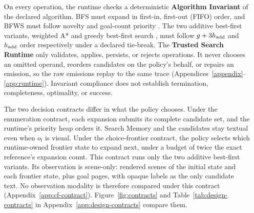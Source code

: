 On every operation, the runtime checks a deterministic \textbf{Algorithm Invariant} of the declared algorithm. BFS must expand in first-in, first-out (FIFO) order, and BFWS must follow novelty and goal-count priority \citep{lipovetzky2017bestfirst}. The two additive best-first variants, weighted A* \citep{hart1968formal,pohl1970heuristic} and greedy best-first search \citep{bonet2001planning}, must follow $g + 3h_{\rm add}$ and $h_{\rm add}$ order respectively under a declared tie-break.
The \textbf{Trusted Search Runtime} only validates, applies, persists, or rejects operations. It never chooses an omitted operand, reorders candidates on the policy's behalf, or repairs an emission, so the raw emissions replay to the same trace (Appendices~\ref{appendix}--\ref{app:runtime}). Invariant compliance does not establish termination, completeness, optimality, or success.

The two decision contracts differ in what the policy chooses. Under the enumeration contract, each expansion submits its complete candidate set, and the runtime's priority heap orders it. Search Memory and the candidates stay textual even when $o_t$ is visual. Under the choice-frontier contract, the policy selects which runtime-owned frontier state to expand next, under a budget of twice the exact reference's expansion count. This contract runs only the two additive best-first variants. Its observation is scene-only: rendered scenes of the initial state and each frontier state, plus goal pages, with opaque labels as the only candidate text. No observation modality is therefore compared under this contract (Appendix~\ref{app:cf-contract}). Figure~\ref{fig:contracts} and Table~\ref{tab:design-contracts} in Appendix~\ref{app:design-contracts} compare them.

